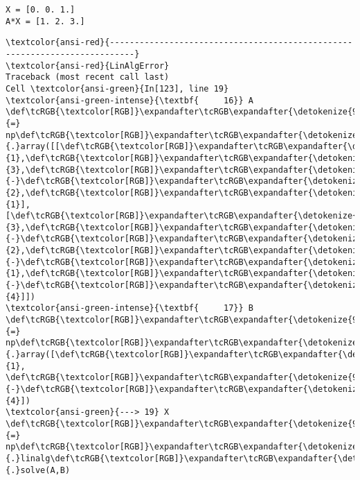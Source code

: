 \documentclass[11pt]{article}
\begin{document}
    \begin{Verbatim}[commandchars=\\\{\}]
X = [0. 0. 1.]
A*X = [1. 2. 3.]
    \end{Verbatim}

    \begin{Verbatim}[commandchars=\\\{\}, frame=single, framerule=2mm, rulecolor=\color{outerrorbackground}]
\textcolor{ansi-red}{---------------------------------------------------------------------------}
\textcolor{ansi-red}{LinAlgError}                               Traceback (most recent call last)
Cell \textcolor{ansi-green}{In[123], line 19}
\textcolor{ansi-green-intense}{\textbf{     16}} A \def\tcRGB{\textcolor[RGB]}\expandafter\tcRGB\expandafter{\detokenize{98,98,98}}{=} np\def\tcRGB{\textcolor[RGB]}\expandafter\tcRGB\expandafter{\detokenize{98,98,98}}{.}array([[\def\tcRGB{\textcolor[RGB]}\expandafter\tcRGB\expandafter{\detokenize{98,98,98}}{1},\def\tcRGB{\textcolor[RGB]}\expandafter\tcRGB\expandafter{\detokenize{98,98,98}}{3},\def\tcRGB{\textcolor[RGB]}\expandafter\tcRGB\expandafter{\detokenize{98,98,98}}{-}\def\tcRGB{\textcolor[RGB]}\expandafter\tcRGB\expandafter{\detokenize{98,98,98}}{2},\def\tcRGB{\textcolor[RGB]}\expandafter\tcRGB\expandafter{\detokenize{98,98,98}}{1}],[\def\tcRGB{\textcolor[RGB]}\expandafter\tcRGB\expandafter{\detokenize{98,98,98}}{3},\def\tcRGB{\textcolor[RGB]}\expandafter\tcRGB\expandafter{\detokenize{98,98,98}}{-}\def\tcRGB{\textcolor[RGB]}\expandafter\tcRGB\expandafter{\detokenize{98,98,98}}{2},\def\tcRGB{\textcolor[RGB]}\expandafter\tcRGB\expandafter{\detokenize{98,98,98}}{-}\def\tcRGB{\textcolor[RGB]}\expandafter\tcRGB\expandafter{\detokenize{98,98,98}}{1},\def\tcRGB{\textcolor[RGB]}\expandafter\tcRGB\expandafter{\detokenize{98,98,98}}{-}\def\tcRGB{\textcolor[RGB]}\expandafter\tcRGB\expandafter{\detokenize{98,98,98}}{4}]])
\textcolor{ansi-green-intense}{\textbf{     17}} B \def\tcRGB{\textcolor[RGB]}\expandafter\tcRGB\expandafter{\detokenize{98,98,98}}{=} np\def\tcRGB{\textcolor[RGB]}\expandafter\tcRGB\expandafter{\detokenize{98,98,98}}{.}array([\def\tcRGB{\textcolor[RGB]}\expandafter\tcRGB\expandafter{\detokenize{98,98,98}}{1}, \def\tcRGB{\textcolor[RGB]}\expandafter\tcRGB\expandafter{\detokenize{98,98,98}}{-}\def\tcRGB{\textcolor[RGB]}\expandafter\tcRGB\expandafter{\detokenize{98,98,98}}{4}])
\textcolor{ansi-green}{---> 19} X \def\tcRGB{\textcolor[RGB]}\expandafter\tcRGB\expandafter{\detokenize{98,98,98}}{=} np\def\tcRGB{\textcolor[RGB]}\expandafter\tcRGB\expandafter{\detokenize{98,98,98}}{.}linalg\def\tcRGB{\textcolor[RGB]}\expandafter\tcRGB\expandafter{\detokenize{98,98,98}}{.}solve(A,B)


\end{Verbatim}
\end{document}
